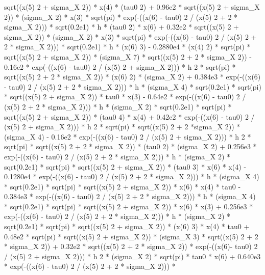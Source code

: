 \begin{maplegroup}
sqrt((x(5)  2 + sigma\_X  2)) * x(4) * (tau0  2) + 0.96e2 * sqrt((x(5)  2 + sigma\_X  2)) * (sigma\_X  2) * x(3) * sqrt(pi) * exp(-((x(6) - tau0)  2 / (x(5)  2 + 2 * sigma\_X  2))) * sqrt(0.2e1) * h * (tau0  2) * x(6) + 0.32e2 * sqrt((x(5)  2 + sigma\_X  2)) * (sigma\_X  2) * x(3) * sqrt(pi) * exp(-((x(6) - tau0) 2 / (x(5)  2 + 2 * sigma\_X  2))) * sqrt(0.2e1) * h * (x(6)  3) - 0.2880e4 * (x(4)  2) * sqrt(pi) * sqrt((x(5)  2 + sigma\_X  2)) * (sigma\_X  7) * sqrt((x(5)  2 + 2 * sigma\_X  2)) - 0.16e2 * exp(-((x(6) - tau0)  2 / (x(5)  2 + sigma\_X  2))) * h 2 * sqrt(pi) * sqrt((x(5)  2 + 2 * sigma\_X  2)) * (x(6)  2) * (sigma\_X  2) + 0.384e3 * exp(-((x(6) - tau0)  2 / (x(5)  2 + 2 * sigma\_X  2))) * h * (sigma\_X  4) * sqrt(0.2e1) * sqrt(pi) * sqrt((x(5)  2 + sigma\_X  2)) * tau0 * x(3) - 0.64e2 * exp(-((x(6) - tau0)  2 / (x(5)  2 + 2 * sigma\_X  2))) * h * (sigma\_X  2) * sqrt(0.2e1) * sqrt(pi) * sqrt((x(5)  2 + sigma\_X  2)) * (tau0  4) * x(4) + 0.42e2 * exp(-((x(6) - tau0)  2 / (x(5)  2 + sigma\_X  2))) * h  2 * sqrt(pi) * sqrt((x(5)  2 + 2 *sigma\_X  2)) * (sigma\_X  4) - 0.16e2 * exp(-((x(6) - tau0)  2 / (x(5)  2 + sigma\_X  2))) * h  2 * sqrt(pi) * sqrt((x(5)  2 + 2 * sigma\_X  2)) * (tau0  2) * (sigma\_X  2) + 0.256e3 * exp(-((x(6) - tau0)  2 / (x(5)  2 + 2 * sigma\_X  2))) * h * (sigma\_X  2) * sqrt(0.2e1) * sqrt(pi) * sqrt((x(5)  2 + sigma\_X  2)) * (tau0  3) * x(6) * x(4) - 0.1280e4 * exp(-((x(6) - tau0)  2 / (x(5)  2 + 2 * sigma\_X  2))) * h * (sigma\_X  4) * sqrt(0.2e1) * sqrt(pi) * sqrt((x(5)  2 + sigma\_X  2)) * x(6) * x(4) * tau0 - 0.384e3 * exp(-((x(6) - tau0)  2 / (x(5)  2 + 2 * sigma\_X  2))) * h * (sigma\_X  4) * sqrt(0.2e1) * sqrt(pi) * sqrt((x(5)  2 + sigma\_X  2)) * x(6) * x(3) + 0.256e3 * exp(-((x(6) - tau0)  2 / (x(5)  2 + 2 * sigma\_X  2))) * h * (sigma\_X 2) * sqrt(0.2e1) * sqrt(pi) * sqrt((x(5)  2 + sigma\_X  2)) * (x(6)  3) * x(4) * tau0 + 0.48e2 * sqrt(pi) * sqrt((x(5)  2 + sigma\_X  2)) * (sigma\_X  3) * sqrt((x(5)  2 + 2 * sigma\_X  2)) + 0.32e2 * sqrt((x(5)  2 + 2 * sigma\_X  2)) * exp(-((x(6)- tau0)  2 / (x(5)  2 + sigma\_X  2))) * h  2 * (sigma\_X  2) * sqrt(pi) * tau0 * x(6) + 0.640e3 * exp(-((x(6) - tau0)  2 / (x(5)  2 + 2 * sigma\_X  2))) * 
\end{maplegroup}
